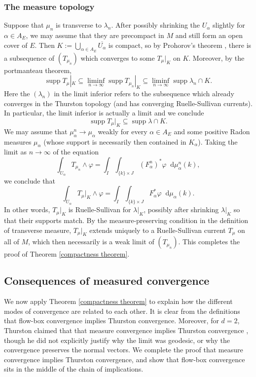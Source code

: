 \documentclass[reqno,11pt]{amsart}
\newcommand*\dif{\mathop{}\!\mathrm{d}}
\DeclareMathOperator{\supp}{supp}
\theoremstyle{definition}
\numberwithin{equation}{section}
\begin{document}
\subsubsection{The measure topology}
Suppose that $\mu_n$ is transverse to $\lambda_n$.
After possibly shrinking the $U_\alpha$ slightly for $\alpha \in A_E$, we may assume that they are precompact in $M$ and still form an open cover of $E$.
Then $K := \bigcup_{\alpha \in A_E} \overline{U_\alpha}$ is compact, so by Prohorov's theorem \cite[Theorem 13.29]{klenke2013probability}, there is a subsequence of $(T_{\mu_n})$ which converges to some $T_\mu|_K$ on $K$.
Moreover, by the portmanteau theorem,
$$\supp T_\mu|_K \subseteq \liminf_{n \to \infty} \supp T_{\mu_n}|_K \subseteq \liminf_{n \to \infty} \supp \lambda_n \cap K.$$
Here the $(\lambda_n)$ in the limit inferior refers to the subsequence which already converges in the Thurston topology (and has converging Ruelle-Sullivan currents).
In particular, the limit inferior is actually a limit and we conclude
$$\supp T_\mu|_K \subseteq \supp \lambda \cap K.$$
We may assume that $\mu_\alpha^n \to \mu_\alpha$ weakly for every $\alpha \in A_E$ and some positive Radon measures $\mu_\alpha$ (whose support is necessarily then contained in $K_\alpha$).
Taking the limit as $n \to \infty$ of the equation 
$$\int_{U_\alpha} T_{\mu_n} \wedge \varphi = \int_I \int_{\{k\} \times J} (F_\alpha^n)^* \varphi \dif \mu_\alpha^n(k),$$
we conclude that
$$\int_{U_\alpha} T_\mu|_K \wedge \varphi = \int_I \int_{\{k\} \times J} F_\alpha^* \varphi \dif \mu_\alpha(k).$$
In other words, $T_\mu|_K$ is Ruelle-Sullivan for $\lambda|_K$, possibly after shrinking $\lambda|_K$ so that their supports match.
By the measure-preserving condition in the definition of transverse measure, $T_\mu|_K$ extends uniquely to a Ruelle-Sullivan current $T_\mu$ on all of $M$, which then necessarily is a weak limit of $(T_{\mu_n})$.
This completes the proof of Theorem \ref{compactness theorem}.


\subsection{Consequences of measured convergence}
We now apply Theorem \ref{compactness theorem} to explain how the different modes of convergence are related to each other.
It is clear from the definitions that flow-box convergence implies Thurston convergence.
Moreover, for $d = 2$, Thurston claimed that that measure convergence implies Thurston convergence \cite[Proposition 8.10.3]{thurston1979geometry}, though he did not explicitly justify why the limit was geodesic, or why the convergence preserves the normal vectors.
We complete the proof that measure convergence implies Thurston convergence, and show that flow-box convergence sits in the middle of the chain of implications.
\end{document}
